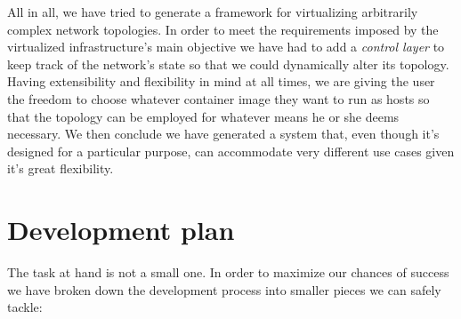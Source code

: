 \documentclass[12pt]{article}
\begin{document}
        All in all, we have tried to generate a framework for virtualizing arbitrarily complex network topologies. In order to meet the requirements imposed by the virtualized infrastructure's main objective we have had to add a \textit{control layer} to keep track of the network's state so that we could dynamically alter its topology. Having extensibility and flexibility in mind at all times, we are giving the user the freedom to choose whatever container image they want to run as hosts so that the topology can be employed for whatever means he or she deems necessary. We then conclude we have generated a system that, even though it's designed for a particular purpose, can accommodate very different use cases given it's great flexibility.\\

    \section{Development plan}
        The task at hand is not a small one. In order to maximize our chances of success we have broken down the development process into smaller pieces we can safely tackle:
\end{document}
